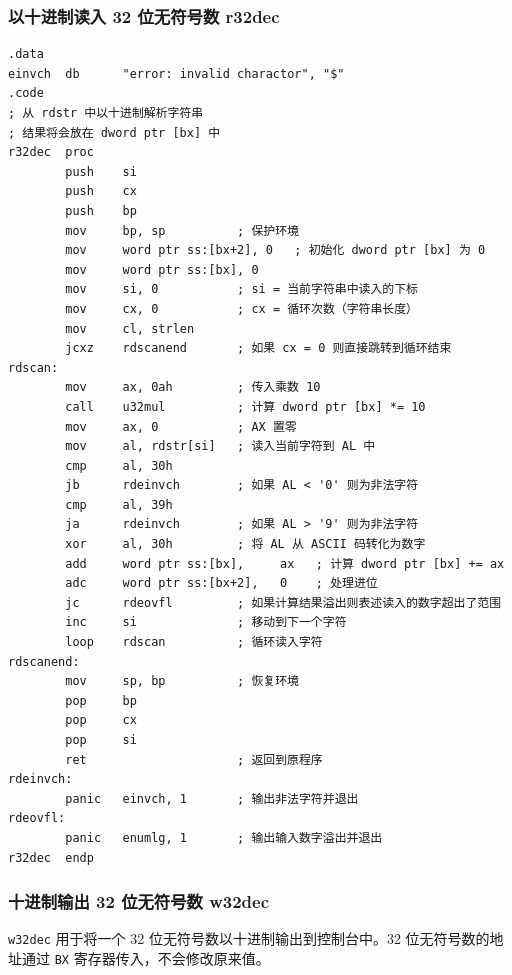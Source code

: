 \subsubsection{以十进制读入 32 位无符号数 r32dec}

\begin{lstlisting}[language={[x86masm]Assembler},morekeywords={}]
.data
einvch  db      "error: invalid charactor", "$"
.code
; 从 rdstr 中以十进制解析字符串
; 结果将会放在 dword ptr [bx] 中 
r32dec  proc
        push    si
        push    cx
        push    bp
        mov     bp, sp          ; 保护环境
        mov     word ptr ss:[bx+2], 0   ; 初始化 dword ptr [bx] 为 0
        mov     word ptr ss:[bx], 0
        mov     si, 0           ; si = 当前字符串中读入的下标
        mov     cx, 0           ; cx = 循环次数（字符串长度）
        mov     cl, strlen
        jcxz    rdscanend       ; 如果 cx = 0 则直接跳转到循环结束
rdscan:
        mov     ax, 0ah         ; 传入乘数 10
        call    u32mul          ; 计算 dword ptr [bx] *= 10
        mov     ax, 0           ; AX 置零
        mov     al, rdstr[si]   ; 读入当前字符到 AL 中
        cmp     al, 30h
        jb      rdeinvch        ; 如果 AL < '0' 则为非法字符
        cmp     al, 39h
        ja      rdeinvch        ; 如果 AL > '9' 则为非法字符
        xor     al, 30h         ; 将 AL 从 ASCII 码转化为数字
        add     word ptr ss:[bx],     ax   ; 计算 dword ptr [bx] += ax
        adc     word ptr ss:[bx+2],   0    ; 处理进位
        jc      rdeovfl         ; 如果计算结果溢出则表述读入的数字超出了范围
        inc     si              ; 移动到下一个字符
        loop    rdscan          ; 循环读入字符
rdscanend:
        mov     sp, bp          ; 恢复环境
        pop     bp
        pop     cx
        pop     si
        ret                     ; 返回到原程序
rdeinvch:
        panic   einvch, 1       ; 输出非法字符并退出
rdeovfl:
        panic   enumlg, 1       ; 输出输入数字溢出并退出
r32dec  endp
\end{lstlisting}

\subsubsection{十进制输出 32 位无符号数 w32dec}

\verb|w32dec| 用于将一个 32 位无符号数以十进制输出到控制台中。32 位无符号数的地址通过 \verb|BX| 寄存器传入，不会修改原来值。

